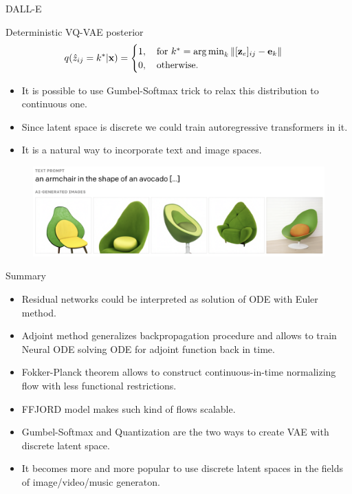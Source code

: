\begin{frame}{DALL-E}
	\begin{block}{Deterministic VQ-VAE posterior}
		\vspace{-0.3cm}
		\[
			q(\hat{z}_{ij} = k^* | \mathbf{x}) = \begin{cases}
				1 , \quad \text{for } k^* = \operatorname*{arg\,min}_k \| [\mathbf{z}_e]_{ij} - \mathbf{e}_k \| \\
				0, \quad \text{otherwise}.
			\end{cases}
		\]
		\vspace{-0.3cm}
	\end{block}
	\begin{itemize}
		\item It is possible to use Gumbel-Softmax trick to relax this distribution to continuous one.
		\item Since latent space is discrete we could train autoregressive transformers in it.
		\item It is a natural way to incorporate text and image spaces.
	\end{itemize}
	\begin{figure}
		\includegraphics[width=\linewidth]{figs/dalle}
	\end{figure}
\end{frame}
\begin{frame}{Summary}
	\begin{itemize}
	\item Residual networks could be interpreted as solution of ODE with Euler method.
	\vfill
	\item Adjoint method generalizes backpropagation procedure and allows to train Neural ODE solving ODE for adjoint function back in time.
	\vfill
	\item Fokker-Planck theorem allows to construct continuous-in-time normalizing flow with less functional restrictions.
	\vfill
	\item FFJORD model makes such kind of flows scalable.
	\vfill
	\item Gumbel-Softmax and Quantization are the two ways to create VAE with discrete latent space.
	\vfill
	\item It becomes more and more popular to use discrete latent spaces in the fields of image/video/music generaton.
	\end{itemize}
\end{frame}
 
